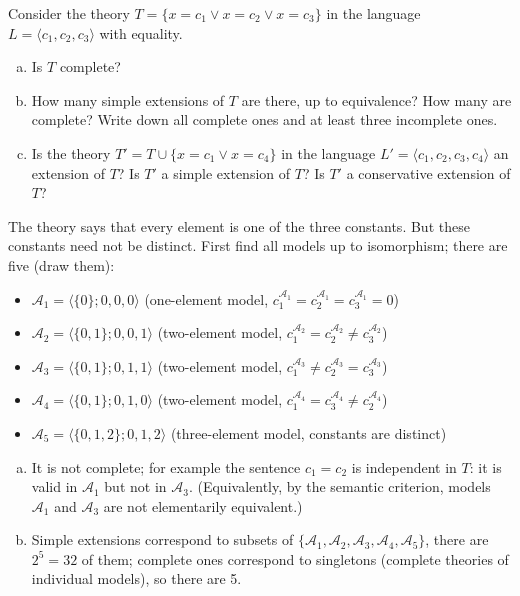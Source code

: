 \begin{problem}

    Consider the theory $T=\{x=c_1 \vee x=c_2 \vee x=c_3\}$ in the language $L=\langle c_1,c_2,c_3\rangle$ with equality.
    \begin{enumerate}[(a)]     
        \item Is $T$ complete?
        \item How many simple extensions of $T$ are there, up to equivalence? How many are complete? Write down all complete ones and at least three incomplete ones.
        \item Is the theory $T'=T\cup\{x=c_1 \vee x=c_4\}$ in the language $L'=\langle c_1,c_2,c_3,c_4\rangle$ an extension of $T$? Is $T'$ a simple extension of $T$? Is $T'$ a conservative extension of $T$?
    \end{enumerate}

    \begin{solution}
        
        The theory says that every element is one of the three constants. But these constants need not be distinct. First find all models up to isomorphism; there are five (draw them):
        \begin{itemize}
            \item $\mathcal A_1=\langle\{0\};0,0,0\rangle$ (one-element model, $c_1^{\mathcal A_1}=c_2^{\mathcal A_1}=c_3^{\mathcal A_1}=0$)
            \item $\mathcal A_2=\langle\{0,1\};0,0,1\rangle$ (two-element model, $c_1^{\mathcal A_2}=c_2^{\mathcal A_2}\neq c_3^{\mathcal A_2}$)
            \item $\mathcal A_3=\langle\{0,1\};0,1,1\rangle$ (two-element model, $c_1^{\mathcal A_3}\neq c_2^{\mathcal A_3}=c_3^{\mathcal A_3}$) 
            \item $\mathcal A_4=\langle\{0,1\};0,1,0\rangle$ (two-element model, $c_1^{\mathcal A_4}=c_3^{\mathcal A_4}\neq c_2^{\mathcal A_4}$)
            \item $\mathcal A_5=\langle\{0,1,2\};0,1,2\rangle$ (three-element model, constants are distinct)
        \end{itemize}
        \begin{enumerate}[(a)]
            \item It is not complete; for example the sentence $c_1=c_2$ is independent in $T$: it is valid in $\mathcal A_1$ but not in $\mathcal A_3$. (Equivalently, by the semantic criterion, models $\mathcal A_1$ and $\mathcal A_3$ are not elementarily equivalent.)
            \item Simple extensions correspond to subsets of $\{\mathcal A_1,\mathcal A_2,\mathcal A_3,\mathcal A_4,\mathcal A_5\}$, there are $2^5=32$ of them; complete ones correspond to singletons (complete theories of individual models), so there are 5.
            

\end{enumerate}
\end{solution}
\end{problem}
